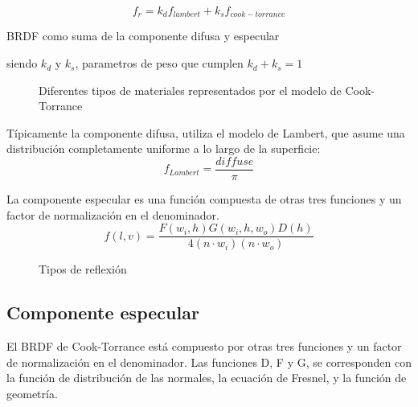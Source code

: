     \begin{eqfloat}[!htb]
        \begin{equation}
            f_r = k_{d}f_{lambert} + k_sf_{cook-torrance}
        \end{equation}
        \caption{BRDF como suma de la componente difusa y especular}
    \end{eqfloat}
    
    siendo $k_d$ y $k_s$, parametros de peso que cumplen $k_d + k_s = 1$
    \singlespacing

    \begin{figure}[H]
        \vspace{0.5cm}
        \centering
        \caption{Diferentes tipos de materiales representados por el modelo de Cook-Torrance \autocite{cooktorrance}}
        \vspace{0.5cm}
    \end{figure}
    
    T\'ipicamente la componente difusa, utiliza el modelo de Lambert, que asume una distribuci\'on completamente uniforme a lo
    largo de la superficie:\\
    
    \begin{equation}
    f_{Lambert} = \frac{diffuse}{\pi}
    \end{equation}
    \singlespacing
    
    La componente especular es una funci\'on compuesta de otras tres funciones y un factor de normalizaci\'on en el
    denominador.\\
    
    \begin{equation}
        f(l, v) = \frac{F(w_i, h) G(w_i, h, w_o) D(h)} {4(n\cdot{w_i}) (n \cdot{w_o})}
    \end{equation}
    \singlespacing

    \begin{figure}[H]
        \centering
        \caption{Tipos de reflexi\'on}
        \vspace{0.5cm}
    \end{figure}
    
        \subsection{Componente especular}
            El BRDF de Cook-Torrance est\'a compuesto por otras tres funciones y un factor de normalizaci\'on en el denominador.
            Las funciones D, F y G, se corresponden con la funci\'on de distribuci\'on de las normales, la ecuaci\'on de Fresnel,
            y la funci\'on de geometr\'ia.\\
    

